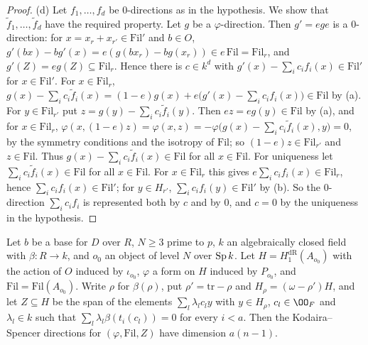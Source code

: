 \begin{proof}
(d) Let $f_1,\dots,f_d$ be $0$-directions as in the hypothesis. We show that $\tilde f_1,\dots,\tilde f_d$ have the required property. Let $g$ be a
$\varphi$-direction. Then $g'=ege$ is a $0$-direction: for $x=x_r+x_{r'}\in\mathrm{Fil}'$ and $b\in O$,
$g'(bx)-bg'(x)=e(g(bx_r)-bg(x_r))\in e\,\mathrm{Fil}=\mathrm{Fil}_r$, and $g'(Z)=eg(Z)\subseteq\mathrm{Fil}_r$. Hence there is $c\in k^d$ with
$g'(x)-\sum_ic_if_i(x)\in\mathrm{Fil}'$ for $x\in\mathrm{Fil}'$. For $x\in\mathrm{Fil}_r$,
$g(x)-\sum_ic_i\tilde f_i(x)=(1-e)g(x)+e\bigl(g'(x)-\sum_ic_if_i(x)\bigr)\in\mathrm{Fil}$ by (a). For $y\in\mathrm{Fil}_{r'}$ put
$z=g(y)-\sum_ic_i\tilde f_i(y)$. Then $ez=eg(y)\in\mathrm{Fil}$ by (a), and for $x\in\mathrm{Fil}_r$,
$\varphi(x,(1-e)z)=\varphi(x,z)=-\varphi\bigl(g(x)-\sum_ic_i\tilde f_i(x),y\bigr)=0$, by the symmetry conditions and the isotropy of $\mathrm{Fil}$; so
$(1-e)z\in\mathrm{Fil}_{r'}$ and $z\in\mathrm{Fil}$. Thus $g(x)-\sum_ic_i\tilde f_i(x)\in\mathrm{Fil}$ for all $x\in\mathrm{Fil}$. For uniqueness let
$\sum_ic_i\tilde f_i(x)\in\mathrm{Fil}$ for all $x\in\mathrm{Fil}$. For $x\in\mathrm{Fil}_r$ this gives $e\sum_ic_if_i(x)\in\mathrm{Fil}_r$, hence
$\sum_ic_if_i(x)\in\mathrm{Fil}'$; for $y\in H_{r'}$, $\sum_ic_if_i(y)\in\mathrm{Fil}'$ by (b). So the $0$-direction $\sum_ic_if_i$ is represented both by
$c$ and by $0$, and $c=0$ by the uniqueness in the hypothesis.
\end{proof}

\begin{proposition}\label{pf:ks1:prop-ksdim}
Let $b$ be a base for $D$ over $R$, $N\ge3$ prime to $p$, $k$ an algebraically closed field with $\beta:R\to k$, and $o_0$ an object of level $N$ over
$\operatorname{Sp} k$. Let $H=H^{\mathrm{dR}}_1(A_{o_0})$ with the action of $O$ induced by $\iota_{o_0}$, $\varphi$ a form on $H$ induced by $P_{o_0}$, and
$\mathrm{Fil}=\mathrm{Fil}(A_{o_0})$. Write $\rho$ for $\beta(\rho)$, put $\rho'=\mathrm{tr}-\rho$ and $H_\rho=(\omega-\rho')H$, and let $Z\subseteq H$
be the span of the elements $\sum_l\lambda_lc_ly$ with $y\in H_\rho$, $c_l\in\OO_F$ and $\lambda_l\in k$ such that $\sum_l\lambda_l\beta(t_i(c_l))=0$
for every $i<a$. Then the Kodaira--Spencer directions for $(\varphi,\mathrm{Fil},Z)$ have dimension $a(n-1)$.
\end{proposition}

